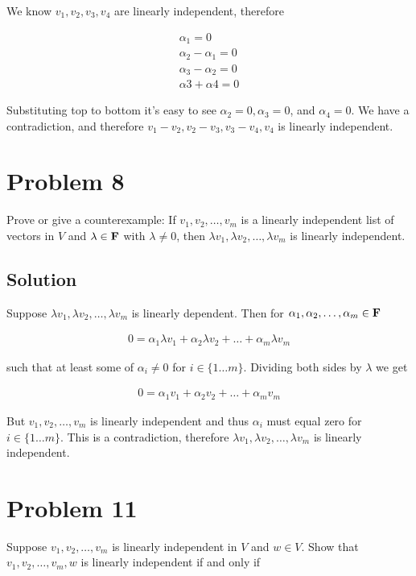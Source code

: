 \documentclass{article}
\begin{document}
We know $v_1, v_2, v_3, v_4$ are linearly independent, therefore

\begin{align*}
\alpha_1=0\\
\alpha_2-\alpha_1=0\\
\alpha_3-\alpha_2=0\\
\alpha3+\alpha4=0
\end{align*}

Substituting top to bottom it's easy to see $\alpha_2=0, \alpha_3=0$, and $\alpha_4=0$. We have a contradiction, and therefore $v_1-v_2, v_2-v_3, v_3-v_4, v_4$ is linearly independent.

\section*{Problem 8}
Prove or give a counterexample: If $v_1, v_2, \ldots, v_m$ is a linearly independent list of vectors in $V$ and $\lambda\in\mathbf{F}$ with $\lambda\neq 0$, then $\lambda v_1, \lambda v_2, \ldots, \lambda v_m$ is linearly independent.

\subsection*{Solution}
Suppose $\lambda v_1, \lambda v_2, \ldots, \lambda v_m$ is linearly dependent. Then for $\alpha_1, \alpha_2, \ldots, \alpha_m\in\mathbf{F}$

\begin{align*}
    0=\alpha_1\lambda v_1 + \alpha_2\lambda v_2 + \ldots + \alpha_m\lambda v_m    
\end{align*}

such that at least some of $\alpha_i\neq 0$ for $i\in\{1\ldots m\}$. Dividing both sides by $\lambda$ we get

\begin{align*}
    0=\alpha_1 v_1 + \alpha_2 v_2 + \ldots + \alpha_m v_m    
\end{align*}

But $v_1, v_2, \ldots, v_m$ is linearly independent and thus $\alpha_i$ must equal zero for $i\in\{1\ldots m\}$. This is a contradiction, therefore $\lambda v_1, \lambda v_2, \ldots, \lambda v_m$ is linearly independent.

\section*{Problem 11}
Suppose $v_1, v_2, \ldots, v_m$ is linearly independent in $V$ and $w\in V$. Show that $v_1, v_2, \ldots, v_m, w$ is linearly independent if and only if
\end{document}
